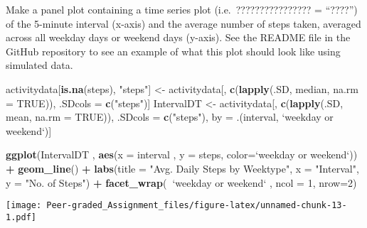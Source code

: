 \documentclass[
]{article}
\newenvironment{Shaded}{\begin{snugshade}}{\end{snugshade}}
\newcommand{\DataTypeTok}[1]{\textcolor[rgb]{0.13,0.29,0.53}{#1}}
\newcommand{\DecValTok}[1]{\textcolor[rgb]{0.00,0.00,0.81}{#1}}
\newcommand{\KeywordTok}[1]{\textcolor[rgb]{0.13,0.29,0.53}{\textbf{#1}}}
\newcommand{\NormalTok}[1]{#1}
\newcommand{\OperatorTok}[1]{\textcolor[rgb]{0.81,0.36,0.00}{\textbf{#1}}}
\newcommand{\OtherTok}[1]{\textcolor[rgb]{0.56,0.35,0.01}{#1}}
\newcommand{\StringTok}[1]{\textcolor[rgb]{0.31,0.60,0.02}{#1}}
\begin{document}
Make a panel plot containing a time series plot (i.e.~???????????????? =
``????'') of the 5-minute interval (x-axis) and the average number of
steps taken, averaged across all weekday days or weekend days (y-axis).
See the README file in the GitHub repository to see an example of what
this plot should look like using simulated data.

\begin{Shaded}
\begin{Highlighting}[]
\NormalTok{activitydata[}\KeywordTok{is.na}\NormalTok{(steps), }\StringTok{"steps"}\NormalTok{] <-}\StringTok{ }\NormalTok{activitydata[, }\KeywordTok{c}\NormalTok{(}\KeywordTok{lapply}\NormalTok{(.SD, median, }\DataTypeTok{na.rm =} \OtherTok{TRUE}\NormalTok{)), .SDcols =}\StringTok{ }\KeywordTok{c}\NormalTok{(}\StringTok{"steps"}\NormalTok{)]}
\NormalTok{IntervalDT <-}\StringTok{ }\NormalTok{activitydata[, }\KeywordTok{c}\NormalTok{(}\KeywordTok{lapply}\NormalTok{(.SD, mean, }\DataTypeTok{na.rm =} \OtherTok{TRUE}\NormalTok{)), .SDcols =}\StringTok{ }\KeywordTok{c}\NormalTok{(}\StringTok{"steps"}\NormalTok{), by =}\StringTok{ }\NormalTok{.(interval, }\StringTok{`}\DataTypeTok{weekday or weekend}\StringTok{`}\NormalTok{)] }

\KeywordTok{ggplot}\NormalTok{(IntervalDT , }\KeywordTok{aes}\NormalTok{(}\DataTypeTok{x =}\NormalTok{ interval , }\DataTypeTok{y =}\NormalTok{ steps, }\DataTypeTok{color=}\StringTok{`}\DataTypeTok{weekday or weekend}\StringTok{`}\NormalTok{)) }\OperatorTok{+}\StringTok{ }\KeywordTok{geom_line}\NormalTok{() }\OperatorTok{+}\StringTok{ }\KeywordTok{labs}\NormalTok{(}\DataTypeTok{title =} \StringTok{"Avg. Daily Steps by Weektype"}\NormalTok{, }\DataTypeTok{x =} \StringTok{"Interval"}\NormalTok{, }\DataTypeTok{y =} \StringTok{"No. of Steps"}\NormalTok{) }\OperatorTok{+}\StringTok{ }\KeywordTok{facet_wrap}\NormalTok{(}\OperatorTok{~}\StringTok{`}\DataTypeTok{weekday or weekend}\StringTok{`}\NormalTok{ , }\DataTypeTok{ncol =} \DecValTok{1}\NormalTok{, }\DataTypeTok{nrow=}\DecValTok{2}\NormalTok{)}
\end{Highlighting}
\end{Shaded}

\texttt{[image: Peer-graded\_Assignment\_files/figure-latex/unnamed-chunk-13-1.pdf]}
\end{document}
